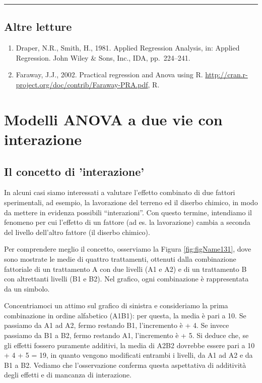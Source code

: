 \documentclass[a4paper,12pt,oneside]{book}
\providecommand{\tightlist}{%
  \setlength{\itemsep}{0pt}\setlength{\parskip}{0pt}}
\begin{document}
\begin{center}\rule{0.5\linewidth}{0.5pt}\end{center}

\hypertarget{altre-letture-9}{%
\section{Altre letture}\label{altre-letture-9}}

\begin{enumerate}
\def\labelenumi{\arabic{enumi}.}
\tightlist
\item
  Draper, N.R., Smith, H., 1981. Applied Regression Analysis, in: Applied Regression. John Wiley \& Sons, Inc., IDA, pp.~224--241.
\item
  Faraway, J.J., 2002. Practical regression and Anova using R. \url{http://cran.r-project.org/doc/contrib/Faraway-PRA.pdf}, R.
\end{enumerate}

\hypertarget{modelli-anova-a-due-vie-con-interazione}{%
\chapter{Modelli ANOVA a due vie con interazione}\label{modelli-anova-a-due-vie-con-interazione}}

\hypertarget{il-concetto-di-interazione}{%
\section{Il concetto di 'interazione'}\label{il-concetto-di-interazione}}

In alcuni casi siamo interessati a valutare l'effetto combinato di due fattori sperimentali, ad esempio, la lavorazione del terreno ed il diserbo chimico, in modo da mettere in evidenza possibili ``interazioni''. Con questo termine, intendiamo il fenomeno per cui l'effetto di un fattore (ad es. la lavorazione) cambia a seconda del livello dell'altro fattore (il diserbo chimico).

Per comprendere meglio il concetto, osserviamo la Figura \ref{fig:figName131}, dove sono mostrate le medie di quattro trattamenti, ottenuti dalla combinazione fattoriale di un trattamento A con due livelli (A1 e A2) e di un trattamento B con altrettanti livelli (B1 e B2). Nel grafico, ogni combinazione è rappresentata da un simbolo.

Concentriamoci un attimo sul grafico di sinistra e consideriamo la prima combinazione in ordine alfabetico (A1B1): per questa, la media è pari a 10. Se passiamo da A1 ad A2, fermo restando B1, l'incremento è + 4. Se invece passiamo da B1 a B2, fermo restando A1, l'incremento è + 5. Si deduce che, se gli effetti fossero puramente additivi, la media di A2B2 dovrebbe essere pari a 10 + 4 + 5 = 19, in quanto vengono modificati entrambi i livelli, da A1 ad A2 e da B1 a B2. Vediamo che l'osservazione conferma questa aspettativa di additività degli effetti e di mancanza di interazione.
\end{document}
